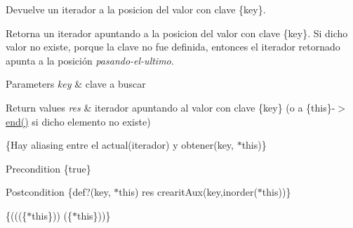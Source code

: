 \-Devuelve un iterador a la posicion del valor con clave \{key\}. 

\-Retorna un iterador apuntando a la posicion del valor con clave \{key\}. \-Si dicho valor no existe, porque la clave no fue definida, entonces el iterador retornado apunta a la posición {\itshape pasando-\/el-\/ultimo\/}.


\begin{DoxyParams}{\-Parameters}
{\em key} & clave a buscar \\
\hline
\end{DoxyParams}

\begin{DoxyRetVals}{\-Return values}
{\em res} & iterador apuntando al valor con clave \{key\} (o a \{this\}-\/$>$\hyperlink{classaed2_1_1iterator_a67caf9468be999e9be96b7add5d79946}{end()} si dicho elemento no existe)\\
\hline
\end{DoxyRetVals}
\{\-Hay aliasing entre el actual(iterador) y obtener(key, $\ast$this)\}

\begin{DoxyPrecond}{\-Precondition}
\{true\} 
\end{DoxyPrecond}
\begin{DoxyPostcond}{\-Postcondition}
\{def?(key, $\ast$this)  res  crearit\-Aux(key,inorder($\ast$this))\}
\end{DoxyPostcond}
\{(((\{$\ast$this\}))  (\{$\ast$this\}))\}

